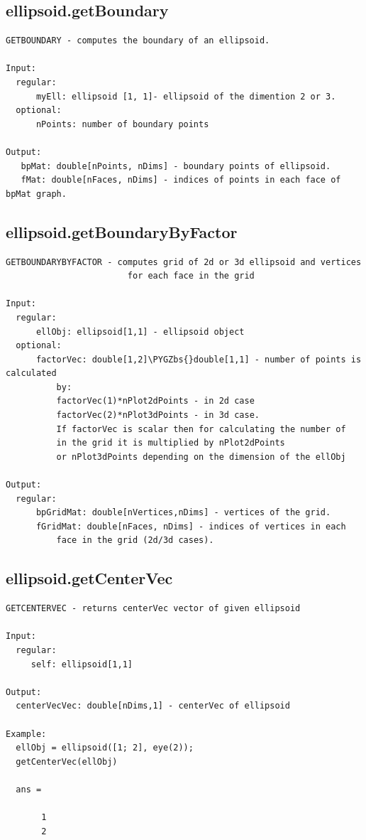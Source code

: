 \documentclass[letterpaper,10pt,english]{sphinxmanual}
\def\PYGZbs{\char`\\}
\begin{document}
\subsection{ellipsoid.getBoundary}
\label{chap_functions:ellipsoid-getboundary}
\begin{Verbatim}[commandchars=\\\{\}]
GETBOUNDARY - computes the boundary of an ellipsoid.

Input:
  regular:
      myEll: ellipsoid [1, 1]- ellipsoid of the dimention 2 or 3.
  optional:
      nPoints: number of boundary points

Output:
   bpMat: double[nPoints, nDims] - boundary points of ellipsoid.
   fMat: double[nFaces, nDims] - indices of points in each face of bpMat graph.
\end{Verbatim}


\subsection{ellipsoid.getBoundaryByFactor}
\label{chap_functions:ellipsoid-getboundarybyfactor}
\begin{Verbatim}[commandchars=\\\{\}]
  GETBOUNDARYBYFACTOR - computes grid of 2d or 3d ellipsoid and vertices
                        for each face in the grid

Input:
  regular:
      ellObj: ellipsoid[1,1] - ellipsoid object
  optional:
      factorVec: double[1,2]\PYGZbs{}double[1,1] - number of points is calculated
          by:
          factorVec(1)*nPlot2dPoints - in 2d case
          factorVec(2)*nPlot3dPoints - in 3d case.
          If factorVec is scalar then for calculating the number of
          in the grid it is multiplied by nPlot2dPoints
          or nPlot3dPoints depending on the dimension of the ellObj

Output:
  regular:
      bpGridMat: double[nVertices,nDims] - vertices of the grid.
      fGridMat: double[nFaces, nDims] - indices of vertices in each
          face in the grid (2d/3d cases).
\end{Verbatim}


\subsection{ellipsoid.getCenterVec}
\label{chap_functions:ellipsoid-getcentervec}
\begin{Verbatim}[commandchars=\\\{\}]
GETCENTERVEC - returns centerVec vector of given ellipsoid

Input:
  regular:
     self: ellipsoid[1,1]

Output:
  centerVecVec: double[nDims,1] - centerVec of ellipsoid

Example:
  ellObj = ellipsoid([1; 2], eye(2));
  getCenterVec(ellObj)

  ans =

       1
       2
\end{Verbatim}
\end{document}
